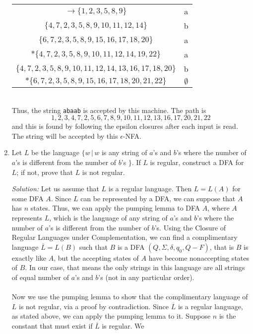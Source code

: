 \documentclass[]{article}
\begin{document}
\begin{enumerate}
\begin{tabular}{c|c}
        $ \rightarrow \{1,2,3,5,8,9\}$                 & a           \\
        $ \{4,7,2,3,5,8,9,10,11,12,14\}$               & b           \\
        $ \{6,7,2,3,5,8,9,15,16,17,18,20\}$            & a           \\
        $*\{4,7,2,3,5,8,9,10,11,12,14,19,22\}$         & a           \\       
        $\{4,7,2,3,5,8,9,10,11,12,14,13,16,17,18,20\}$ & b           \\
        $*\{6,7,2,3,5,8,9,15,16,17,18,20,21,22\}$     & $\emptyset$ \\
      \end{tabular} \\
     Thus, the string \texttt{abaab} is accepted by this machine. The path is
        \[
           1, 2, 3, 4, 7, 2, 5, 6, 7, 8, 9, 10, 11, 12, 13, 16, 17, 20, 21, 22
        \]
    and this is found by following the epsilon closures after each input
    is read. The string will be accepted by this $\epsilon$-NFA.
    \item Let $L$ be the language $\{ w \, | \, w$ is any string of $a$'s and
    $b$'s where the number of $a$'s is different from the number of $b$'s $\}$.
    If $L$ is regular, construct a DFA for $L$; if not, prove that $L$ is not
    regular.
    \item[\emph{Solution:}] Let us assume that $L$ is a regular language. Then 
    $L = L(A)$ for some DFA $A$. Since $L$ can be represented by a DFA, we can
    suppose that $A$ has $n$ states. Thus, we can apply the pumping lemma to 
    DFA $A$, where $A$ represents $L$, which is the language of any string of 
    $a$'s and $b$'s where the number of $a$'s is different from the number of 
    $b$'s. Using the Closure of Regular Languages under Complementation, we can 
    find a complimentary language $\overline{L} = L(B)$ such that $B$ is a DFA 
    $(Q, \Sigma, \delta, q_0, Q-F)$, that is $B$ is exactly like $A$, but the 
    accepting states of $A$ have become nonaccepting states of $B$. In our case,
    that means the only strings in this language are all strings of equal number
    of $a$'s and $b$'s (not in any particular order). \\ \\
    Now we use the pumping lemma to show that the complimentary language
    of $L$ is not regular, via a proof by contradiction. Since $\overline{L}$ is
    a regular language, as stated above, we can apply the pumping lemma to it.
    Suppose $n$ is the constant that must exist if $\overline{L}$ is regular. We

\end{enumerate}
\end{document}
